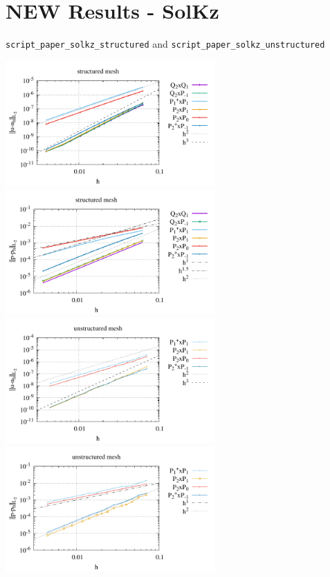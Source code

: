 \newpage
\section*{NEW Results - SolKz}

{\tt script\_paper\_solkz\_structured} and {\tt script\_paper\_solkz\_unstructured}

\begin{center}
\includegraphics[width=8cm]{python_codes/fieldstone_120/paperresults/solkz_structured_errorsV.pdf}
\includegraphics[width=8cm]{python_codes/fieldstone_120/paperresults/solkz_structured_errorsP.pdf}\\
\includegraphics[width=8cm]{python_codes/fieldstone_120/paperresults/solkz_unstructured_errorsV.pdf}
\includegraphics[width=8cm]{python_codes/fieldstone_120/paperresults/solkz_unstructured_errorsP.pdf}
\end{center}

